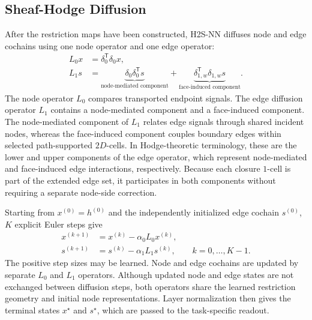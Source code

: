 \documentclass[sigconf,anonymous,review]{acmart}
\newcommand{\method}{\textsc{H2S-NN}}
\newcommand{\transpose}{\mathsf{T}}
\begin{document}

\subsection{Sheaf-Hodge Diffusion}
\label{sec:closure}

After the restriction maps have been constructed, \method{} diffuses node
and edge cochains using one node operator and one edge operator:
\begin{align}
  L_0x
  &=\delta_0^{\transpose}\delta_0x,
  \label{eq:l0}\\
  L_1s
  &=\underbrace{\delta_0\delta_0^{\transpose}s}_{\text{node-mediated component}}
    +\underbrace{\delta_{1,w}^{\transpose}\delta_{1,w}s}_{\text{face-induced component}} .
  \label{eq:l1}
\end{align}
The node operator \(L_0\) compares transported endpoint signals. The edge diffusion operator \(L_1\) contains a node-mediated component and a face-induced component. The
node-mediated component of \(L_1\) relates edge signals through shared
incident nodes, whereas the face-induced component couples boundary edges
within selected path-supported \(2D\)-cells. In Hodge-theoretic terminology,
these are the lower and upper components of the edge operator, which represent node-mediated and face-induced edge interactions, respectively. Because each closure \(1\)-cell is part of the extended edge
set, it participates in both components without requiring a separate
node-side correction.

Starting from \(x^{(0)}=h^{(0)}\) and the independently initialized edge cochain \(s^{(0)}\),
\(K\) explicit Euler steps give
\begin{equation}
  \begin{aligned}
  x^{(k+1)}&=x^{(k)}-\alpha_0L_0x^{(k)},\\
  s^{(k+1)}&=s^{(k)}-\alpha_1L_1s^{(k)},
  \qquad k=0,\ldots,K-1 .
  \end{aligned}
  \label{eq:diffusion}
\end{equation}
The positive step sizes may be learned.  Node and edge cochains are updated by separate \(L_0\) and \(L_1\) operators. Although updated node and edge states are not exchanged between diffusion steps, both operators share the learned restriction geometry and initial node representations. Layer normalization then gives the terminal states \(x^\star\) and \(s^\star\), which are passed to
the task-specific readout.
\end{document}
